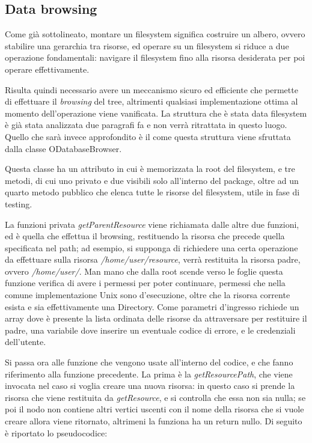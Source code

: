 \subsection{Data browsing}
Come già sottolineato, montare un filesystem significa costruire un albero, ovvero stabilire una gerarchia tra risorse, ed operare su un filesystem si riduce a due operazione fondamentali: navigare il filesystem fino alla risorsa desiderata per poi operare effettivamente.

Risulta quindi necessario avere un meccanismo sicuro ed efficiente che permette di effettuare il \emph{browsing} del tree, altrimenti qualsiasi implementazione ottima al momento dell'operazione viene vanificata. La struttura che è stata data filesystem è già stata analizzata due paragrafi fa e non verrà ritrattata in questo luogo. Quello che sarà invece approfondito è il come questa struttura viene sfruttata dalla classe ODatabaseBrowser. 

Questa classe ha un attributo in cui è memorizzata la root del filesystem, e tre metodi, di cui uno privato e due visibili solo all'interno del package, oltre ad un quarto metodo pubblico che elenca tutte le risorse del filesystem, utile in fase di testing. 

La funzioni privata \emph{getParentResource} viene richiamata dalle altre due funzioni, ed è quella che effettua il browsing, restituendo la risorsa che precede quella specificata nel path; ad esempio, si supponga di richiedere una certa operazione da effettuare sulla risorsa \emph{/home/user/resource}, verrà restituita la risorsa padre, ovvero \emph{/home/user/}. Man mano che dalla root scende verso le foglie questa funzione verifica di avere i permessi per poter continuare, permessi che nella comune implementazione Unix sono d'esecuzione, oltre che la risorsa corrente esista e sia effettivamente una Directory. Come parametri d'ingresso richiede un array dove è presente la lista ordinata delle risorse da attraversare per restituire il padre, una variabile dove inserire un eventuale codice di errore, e le credenziali dell'utente.

Si passa ora alle funzione che vengono usate all'interno del codice, e che fanno riferimento alla funzione precedente. La prima è la \emph{getResourcePath}, che viene invocata nel caso si voglia creare una nuova risorsa: in questo caso si prende la risorsa che viene restituita da \emph{getResource}, e si controlla che essa non sia nulla; se poi il nodo non contiene altri vertici uscenti con il nome della risorsa che si vuole creare allora viene ritornato, altrimeni la funziona ha un return nullo. Di seguito è riportato lo pseudocodice:

